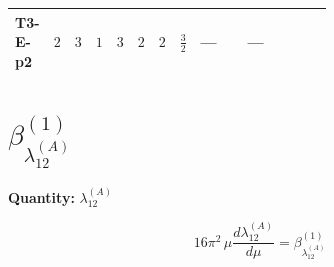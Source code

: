 \documentclass[8pt]{article}
\begin{document}
\begin{landscape}
\begin{longtable}{@{}llcccccc >{\raggedright\arraybackslash}p{0.21\linewidth} >{\raggedright\arraybackslash}p{0.21\linewidth} >{\raggedright\arraybackslash}p{0.21\linewidth}@{}}
\midrule
T3-E-p2 & $2$ & $3$ & $1$ & $3$ & $2$ & $2$ & $\frac{3}{2}$ & --- & --- & \scriptsize\adjustbox{max width=\linewidth}{$\begin{gathered} {\lambda_5} \left(T_{\nu}^{(1)}+T_{\nu}^{(2)}+6 \operatorname{Tr}\!\left({Y_d}\,\left({Y_d}\right)^{\dagger}\right)+2 \operatorname{Tr}\!\left({Y_e}\,\left({Y_e}\right)^{\dagger}\right)+6 \operatorname{Tr}\!\left({Y_u}\,\left({Y_u}\right)^{\dagger}\right)-\frac{4 {\lambda_{12}^{(A)}}}{3}-2 {\lambda_{12}^{(\times)}}-2 {\lambda_{HS_1}^{(A)}}-\frac{4 {\lambda_{HS_2}^{(A)}}}{3}\right)\end{gathered}$} \\
\midrule
\bottomrule
\end{longtable}
\clearpage
\section*{$\beta_{\lambda_{12}^{(A)}}^{(1)}$}
\noindent\textbf{Quantity: }$\lambda_{12}^{(A)}$\par\smallskip
\[16\pi^2\,\mu\frac{d \lambda_{12}^{(A)}}{d\mu}=\beta_{\lambda_{12}^{(A)}}^{(1)}\]

\end{landscape}
\end{document}
